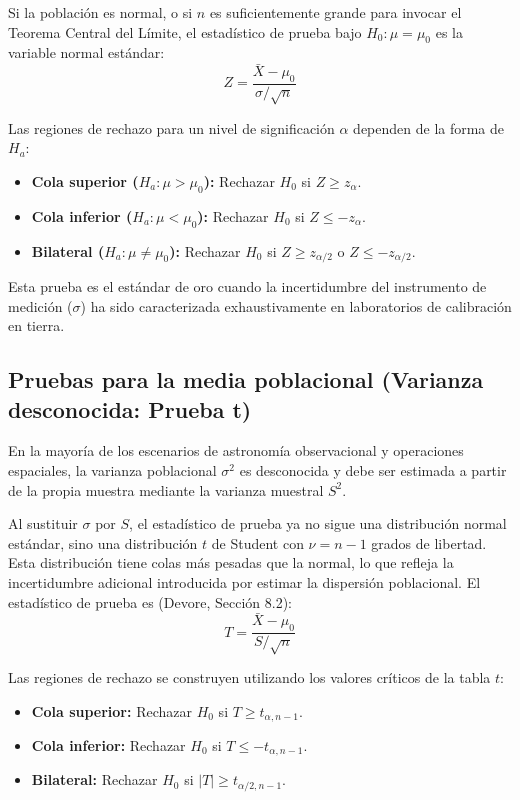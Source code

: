Si la población es normal, o si $n$ es suficientemente grande para invocar el Teorema Central del Límite, el estadístico de prueba bajo $H_0: \mu = \mu_0$ es la variable normal estándar:
$$ Z = \frac{\bar{X} - \mu_0}{\sigma / \sqrt{n}} $$

Las regiones de rechazo para un nivel de significación $\alpha$ dependen de la forma de $H_a$:
\begin{itemize}
    \item \textbf{Cola superior ($H_a: \mu > \mu_0$):} Rechazar $H_0$ si $Z \ge z_{\alpha}$.
    \item \textbf{Cola inferior ($H_a: \mu < \mu_0$):} Rechazar $H_0$ si $Z \le -z_{\alpha}$.
    \item \textbf{Bilateral ($H_a: \mu \neq \mu_0$):} Rechazar $H_0$ si $Z \ge z_{\alpha/2}$ o $Z \le -z_{\alpha/2}$.
\end{itemize}

Esta prueba es el estándar de oro cuando la incertidumbre del instrumento de medición ($\sigma$) ha sido caracterizada exhaustivamente en laboratorios de calibración en tierra.

\subsection{Pruebas para la media poblacional (Varianza desconocida: Prueba t)}

En la mayoría de los escenarios de astronomía observacional y operaciones espaciales, la varianza poblacional $\sigma^2$ es desconocida y debe ser estimada a partir de la propia muestra mediante la varianza muestral $S^2$. 

Al sustituir $\sigma$ por $S$, el estadístico de prueba ya no sigue una distribución normal estándar, sino una distribución $t$ de Student con $\nu = n - 1$ grados de libertad. Esta distribución tiene colas más pesadas que la normal, lo que refleja la incertidumbre adicional introducida por estimar la dispersión poblacional. El estadístico de prueba es (Devore, Sección 8.2):
$$ T = \frac{\bar{X} - \mu_0}{S / \sqrt{n}} $$

Las regiones de rechazo se construyen utilizando los valores críticos de la tabla $t$:
\begin{itemize}
    \item \textbf{Cola superior:} Rechazar $H_0$ si $T \ge t_{\alpha, n-1}$.
    \item \textbf{Cola inferior:} Rechazar $H_0$ si $T \le -t_{\alpha, n-1}$.
    \item \textbf{Bilateral:} Rechazar $H_0$ si $|T| \ge t_{\alpha/2, n-1}$.
\end{itemize}

